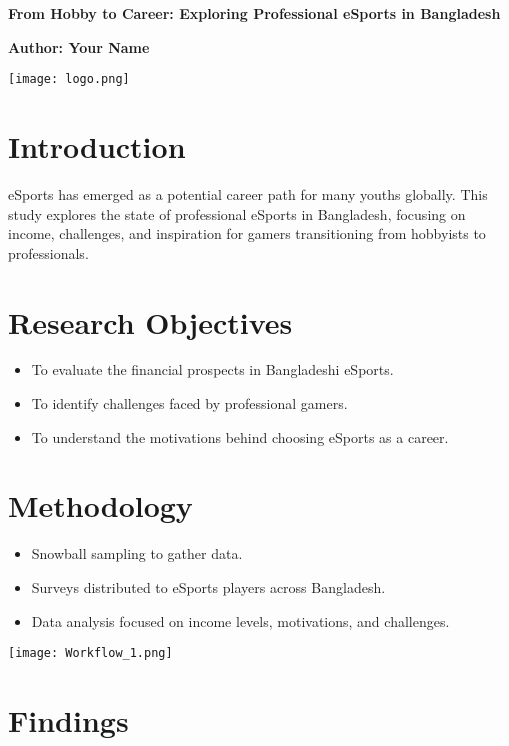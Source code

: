 \documentclass[a0paper,portrait]{a0poster}
\begin{document}
\begin{center}
    \veryHuge \textbf{From Hobby to Career: Exploring Professional eSports in Bangladesh} \par
    \vspace{1cm}
    \Huge \textbf{Author: Your Name} \par
    \vspace{1cm}
    \texttt{[image: logo.png]}
\end{center}

\vspace{2cm}

\begin{multicols}{3}

\section*{Introduction}
eSports has emerged as a potential career path for many youths globally. This study explores the state of professional eSports in Bangladesh, focusing on income, challenges, and inspiration for gamers transitioning from hobbyists to professionals.

\section*{Research Objectives}
\begin{itemize}
    \item To evaluate the financial prospects in Bangladeshi eSports.
    \item To identify challenges faced by professional gamers.
    \item To understand the motivations behind choosing eSports as a career.
\end{itemize}

\section*{Methodology}
\begin{itemize}
    \item Snowball sampling to gather data.
    \item Surveys distributed to eSports players across Bangladesh.
    \item Data analysis focused on income levels, motivations, and challenges.
\end{itemize}
\texttt{[image: Workflow\_1.png]}

\section*{Findings}

\end{multicols}
\end{document}
